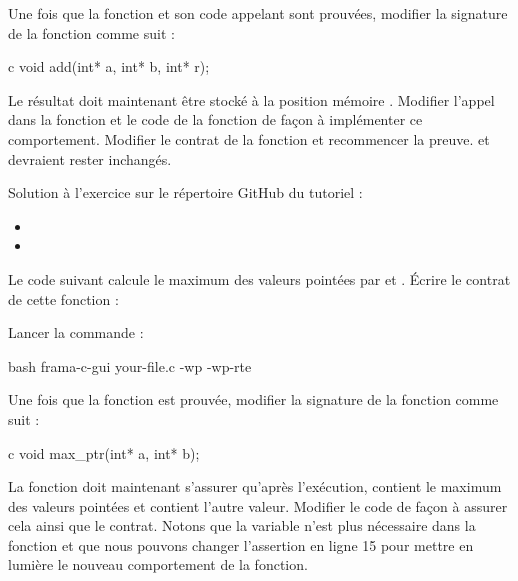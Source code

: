 Une fois que la fonction et son code appelant sont prouvées, modifier
la signature de la fonction comme suit :


\begin{CodeBlock}{c}
void add(int* a, int* b, int* r);
\end{CodeBlock}


Le résultat doit maintenant être stocké à la position mémoire .
Modifier l'appel dans la fonction  et le code de la fonction de
façon à implémenter ce comportement. Modifier le contrat de la fonction
 et recommencer la preuve.  et 
devraient rester inchangés.


\begin{Information}
  Solution à l'exercice sur le répertoire GitHub du tutoriel :
  \begin{itemize}
    \item {}
    \item {}
  \end{itemize}
\end{Information}




Le code suivant calcule le maximum des valeurs pointées par 
et . Écrire le contrat de cette fonction :




Lancer la commande :


\begin{CodeBlock}{bash}
frama-c-gui your-file.c -wp -wp-rte
\end{CodeBlock}


Une fois que la fonction est prouvée, modifier la signature de la
fonction comme suit :


\begin{CodeBlock}{c}
void max_ptr(int* a, int* b);
\end{CodeBlock}


La fonction doit maintenant s'assurer qu'après l'exécution, 
contient le maximum des valeurs pointées et  contient l'autre
valeur. Modifier le code de façon à assurer cela ainsi que le contrat.
Notons que la variable   n'est plus nécessaire dans la fonction
 et que nous pouvons changer l'assertion en ligne 15 pour
mettre en lumière le nouveau comportement de la fonction.


